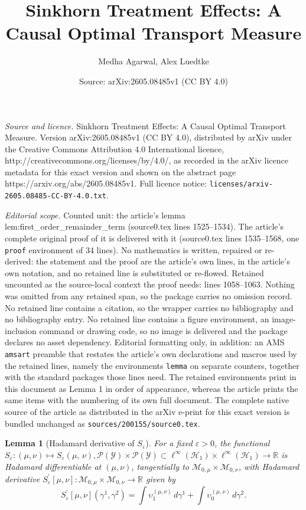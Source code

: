 \documentclass[10pt,a4paper]{amsart}
\title{Sinkhorn Treatment Effects: A Causal Optimal Transport Measure}
\author{Medha Agarwal, Alex Luedtke}
\date{Source: arXiv:2605.08485v1 (CC BY 4.0)}
\newtheorem{lemma}{Lemma}
\newcommand{\R}{\mathbb{R}}
\newcommand{\SinkDiv}[2]{{S}_\eps\of{#1,\, #2}}
\newcommand{\cH}{\mathcal{H}}
\newcommand{\cM}{\mathcal{M}}
\newcommand{\cP}{\mathcal{P}}
\newcommand{\cY}{\mathcal{Y}}
\newcommand{\eps}{\varepsilon}
\newcommand{\of}[1]{\left(#1\right)}
\begin{document}
\maketitle

\noindent\emph{Source and licence.} Sinkhorn Treatment Effects: A Causal Optimal Transport Measure. Version arXiv:2605.08485v1 (CC BY 4.0), distributed by arXiv under the Creative Commons Attribution 4.0 International licence, http://creativecommons.org/licenses/by/4.0/, as recorded in the arXiv licence metadata for this exact version and shown on the abstract page https://arxiv.org/abs/2605.08485v1. Full licence notice: \texttt{licenses/arxiv-2605.08485-CC-BY-4.0.txt}.\par\smallskip

\noindent\textit{Editorial scope.} Counted unit: the article's lemma lem:first\_order\_remainder\_term (source0.tex lines 1525--1534). The article's complete original proof of it is delivered with it (source0.tex lines 1535--1568, one \texttt{proof} environment of 34 lines). No mathematics is written, repaired or re-derived: the statement and the proof are the article's own lines, in the article's own notation, and no retained line is substituted or re-flowed.  Retained uncounted as the source-local context the proof needs: lines 1058--1063.  Nothing was omitted from any retained span, so the package carries no omission record.  No retained line contains a citation, so the wrapper carries no bibliography and no bibliography entry.  No retained line contains a figure environment, an image-inclusion command or drawing code, so no image is delivered and the package declares no asset dependency.  Editorial formatting only, in addition: an AMS \texttt{amsart} preamble that restates the article's own declarations and macros used by the retained lines, namely the environments \texttt{lemma} on separate counters, together with the standard packages those lines need.  The retained environments print in this document as Lemma 1 in order of appearance, whereas the article prints the same items with the numbering of its own full document.  The complete native source of the article as distributed in the arXiv e-print for this exact version is bundled unchanged as \texttt{sources/200155/source0.tex}.
\begin{lemma}[Hadamard derivative of $S_\eps$]\label{lem:Sinkhorn_first_order_Hadamard_diff}
    For a fixed $\eps > 0$, the functional $S_\eps: (\mu, \nu) \mapsto \SinkDiv{\mu}{\nu}, \cP(\cY) \times \cP(\cY) \subset \ell^\infty(\cH_1) \times \ell^\infty(\cH_1) \to \R$ is Hadamard differentiable at $(\mu, \nu)$, tangentially to $\cM_{0, \mu} \times \cM_{0, \nu}$, with Hadamard derivative $S_\eps^\prime[\mu, \nu]: \cM_{0, \mu} \times \cM_{0, \nu} \to \R$ given by
    \[
    S_\eps^\prime[\mu, \nu](\gamma^1, \gamma^2) = \int \upsilon_1^{(\mu, \nu)} \,d\gamma^1 + \int \upsilon_0^{(\mu, \nu)} \,d\gamma^2.
    \]
\end{lemma}
\end{document}
